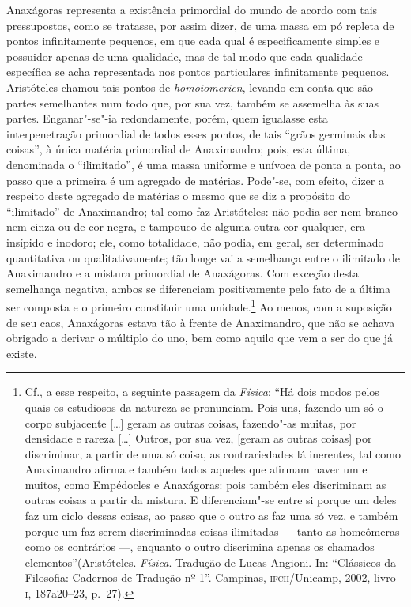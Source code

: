 Anaxágoras representa a existência primordial do mundo de acordo com tais
pressupostos, como se tratasse, por assim dizer, de uma massa em pó repleta
de pontos infinitamente pequenos, em que cada qual é especificamente simples
e possuidor apenas de uma qualidade, mas de tal modo que cada qualidade
específica se acha representada nos pontos particulares infinitamente
pequenos. Aristóteles chamou tais pontos de \textit{homoiomerien}, levando em 
conta que são partes semelhantes num todo
 que, por sua vez, também se assemelha às suas partes.\label{suaspartes} 
 Enganar"-se"-ia redondamente, porém, quem igualasse esta
 interpenetração primordial de todos esses pontos, de tais ``grãos germinais
 das coisas'', à única matéria primordial de Anaximandro; pois, esta última,
 denominada o ``ilimitado'', é uma massa uniforme e unívoca de ponta a ponta,
 ao passo que a primeira é um agregado de matérias. Pode"-se, com efeito,
 dizer a respeito deste agregado de matérias o mesmo que se diz a propósito
 do ``ilimitado'' de Anaximandro; tal como faz Aristóteles: não podia ser nem
 branco nem cinza ou de cor negra, e tampouco de alguma outra cor qualquer,
 era insípido e inodoro; ele, como totalidade, não podia, em geral, ser
 determinado quantitativa ou qualitativamente; tão longe vai a semelhança
 entre o ilimitado de Anaximandro e a mistura primordial de Anaxágoras. Com
 exceção desta semelhança negativa, ambos se diferenciam positivamente pelo
 fato de a última ser composta e o primeiro constituir uma unidade.\footnote
 { Cf., a esse respeito, a seguinte passagem da \textit{Física}: ``Há dois
 modos pelos quais os estudiosos da natureza se pronunciam. Pois uns, fazendo
 um só o corpo subjacente [\ldots] geram as outras coisas, fazendo"-as
 muitas, por densidade e rareza [\ldots] Outros, por sua vez, [geram as
 outras coisas] por discriminar, a partir de uma só coisa, as contrariedades
 lá inerentes, tal como Anaximandro afirma e também todos aqueles que afirmam
 haver um e muitos, como Empédocles e Anaxágoras: pois também eles
 discriminam as outras coisas a partir da mistura. E diferenciam"-se entre si
 porque um deles faz um ciclo dessas coisas, ao passo que o outro as faz uma
 só vez, e também porque um faz serem discriminadas coisas ilimitadas ---
 tanto as homeômeras como os contrários ---, enquanto o outro discrimina
 apenas os chamados elementos''(Aristóteles. \textit{Física}. Tradução de
 Lucas Angioni. In: ``Clássicos da Filosofia: Cadernos de Tradução nº 1''.
 Campinas, \textsc{ifch}/Unicamp, 2002, livro \textsc{i}, 187a20--23,
 p.~27).} Ao menos, com a suposição de seu caos, Anaxágoras estava tão à
 frente de Anaximandro, que não se achava obrigado a derivar o múltiplo do
 uno, bem como aquilo que vem a ser do que já existe.


